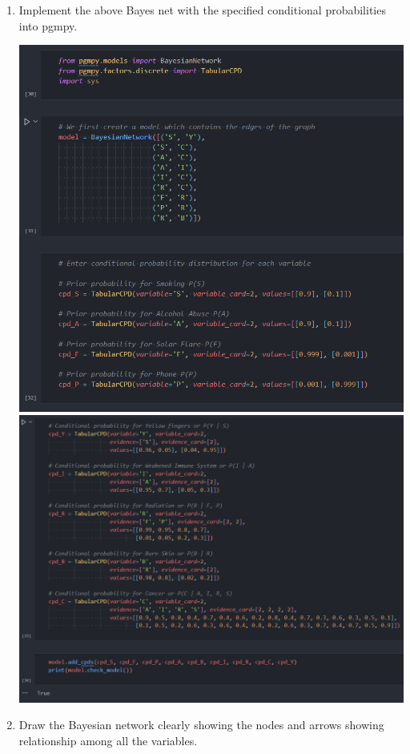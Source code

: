 \item
\begin{enumerate}
  \item Implement the above Bayes net with the specified conditional probabilities into pgmpy.
        \begin{center}
          \includegraphics[scale=0.5]{"./Diagrams/Q3 Code Page 1.PNG"}
          \includegraphics[scale=0.5]{"./Diagrams/Q3 Code Page 2.PNG"}
        \end{center}
        \clearpage
  \item Draw the Bayesian network clearly showing the nodes and arrows showing relationship among all the variables.
        \begin{center}
          \begin{tikzpicture}[->,>=stealth,auto,node distance=0cm,
              thick,main node/.style={circle,draw}, minimum size=1cm]


\end{tikzpicture}
\end{center}
\end{enumerate}

